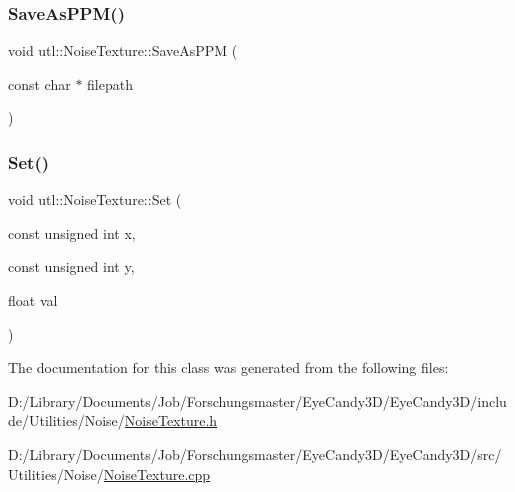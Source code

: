 \mbox{\label{classutl_1_1_noise_texture_aa010ee3b9e3373bdbbae4ca20969f3c7}} 
\subsubsection{\texorpdfstring{Save\+As\+P\+P\+M()}{SaveAsPPM()}}
{\footnotesize\ttfamily void utl\+::\+Noise\+Texture\+::\+Save\+As\+P\+PM (\begin{DoxyParamCaption}\item[{const char $\ast$}]{filepath }\end{DoxyParamCaption})}

\mbox{\label{classutl_1_1_noise_texture_ae64e6afa2c1a820ffcf18cb781a69022}} 
\subsubsection{\texorpdfstring{Set()}{Set()}}
{\footnotesize\ttfamily void utl\+::\+Noise\+Texture\+::\+Set (\begin{DoxyParamCaption}\item[{const unsigned int}]{x,  }\item[{const unsigned int}]{y,  }\item[{float}]{val }\end{DoxyParamCaption})}



The documentation for this class was generated from the following files\+:\begin{DoxyCompactItemize}
\item 
D\+:/\+Library/\+Documents/\+Job/\+Forschungsmaster/\+Eye\+Candy3\+D/\+Eye\+Candy3\+D/include/\+Utilities/\+Noise/\mbox{\hyperlink{_noise_texture_8h}{Noise\+Texture.\+h}}\item 
D\+:/\+Library/\+Documents/\+Job/\+Forschungsmaster/\+Eye\+Candy3\+D/\+Eye\+Candy3\+D/src/\+Utilities/\+Noise/\mbox{\hyperlink{_noise_texture_8cpp}{Noise\+Texture.\+cpp}}\end{DoxyCompactItemize}
